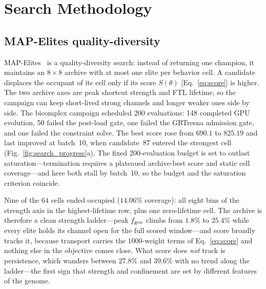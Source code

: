 \documentclass[twocolumn,floatfix,aps,prd,nofootinbib]{revtex4-2}
\begin{document}
\section{Search Methodology}
\label{sec:methodology}

\subsection{MAP-Elites quality-diversity}

MAP-Elites~\cite{mouret15} is a quality-diversity search: instead of returning
one champion, it maintains an $8\times8$ archive with at most one elite per
behavior cell. A candidate displaces the occupant of its cell only if its score
$S(\theta)$ [Eq.~\eqref{eq:score}] is higher. The two archive axes are peak
shortcut strength and FTL lifetime, so the campaign can keep short-lived strong
channels and longer weaker ones side by side. The bicomplex campaign
scheduled 200 evaluations: 148 completed GPU evolution, 50 failed the post-load
gate, one failed the GRTresna admission gate, and one failed the constraint
solve. The best score rose from $690.1$ to $825.19$ and last improved at
batch~10, when candidate~87 entered the strongest cell
(Fig.~\ref{fig:search_progress}a). The fixed $200$-evaluation budget is
set to outlast saturation---termination requires a plateaued archive-best score
and static cell coverage---and here both stall by batch~10, so the budget and
the saturation criterion coincide.

Nine of the $64$ cells ended occupied ($14.06\%$ coverage): all eight bins of
the strength axis in the highest-lifetime row, plus one zero-lifetime cell. The
archive is therefore a clean strength ladder---peak $f_{\rm geo}$ climbs from
$1.8\%$ to $25.4\%$ while every elite holds its channel open for the full
scored window---and score broadly tracks it, because transport carries the
$1000$-weight terms of Eq.~\eqref{eq:score} and nothing else in the objective
comes close. What score does \emph{not} track is persistence, which wanders
between $27.8\%$ and $39.6\%$ with no trend along the ladder---the first sign
that strength and confinement are set by different features of the genome.
\end{document}
